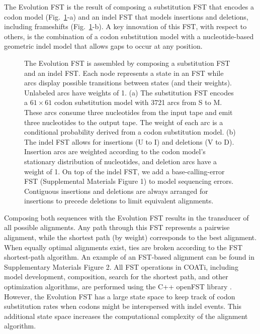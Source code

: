 The Evolution FST is the result of composing a substitution FST that encodes a codon model (Fig.\ \ref{fig:evolution-fst}-a) and an indel FST that models insertions and deletions, including frameshifts (Fig.\ \ref{fig:evolution-fst}-b).
A key innovation of this FST, with respect to others, is the combination of a codon substitution model with a nucleotide-based geometric indel model that allows gaps to occur at any position.

\begin{figure}[h!]
\centering
\setlength{\columnsep}{-3cm}
\begin{multicols}{2}
    \hspace*{-2.8cm}\resizebox{0.55\textwidth}{!}{}
    \columnbreak
    \resizebox{0.55\textwidth}{!}{}
\end{multicols}
\par
\caption{The Evolution FST is assembled by composing a substitution FST and an indel FST.
Each node represents a state in an FST while arcs display possible transitions between states (and their weights). Unlabeled arcs have weights of 1.
(a) The substitution FST encodes a $61 \times 61 $ codon substitution model with 3721 arcs from S to M. These arcs consume three nucleotides from the input tape and emit three nucleotides to the output tape. The weight of each arc is a conditional probability derived from a codon substitution model.
(b) The indel FST allows for insertions (U to I) and deletions (V to D). Insertion arcs are weighted according to the codon model's stationary distribution of nucleotides, and deletion arcs have a weight of 1. On top of the indel FST, we add a base-calling-error FST (Supplemental Materials Figure 1) to model sequencing errors. Contiguous insertions and deletions are always arranged for insertions to precede deletions to limit equivalent alignments.}
\label{fig:evolution-fst}
\end{figure}

Composing both sequences with the Evolution FST results in the transducer of all possible alignments.
Any path through this FST represents a pairwise alignment, while the shortest path (by weight) corresponds to the best alignment.
When equally optimal alignments exist, ties are broken according to the FST shortest-path algorithm.
An example of an FST-based alignment can be found in Supplementary Materials Figure 2.
All FST operations in COATi, including model development, composition, search for the shortest path, and other optimization algorithms, are performed using the C++ openFST library .
However, the Evolution FST has a large state space to keep track of codon substitution rates when codons might be interspersed with indel events. This additional state space increases the computational complexity of the alignment algorithm.

